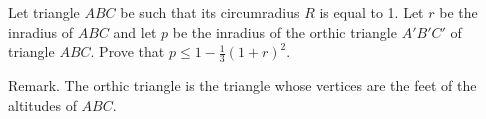 Let triangle $ABC$ be such that its circumradius $R$ is equal to 1. Let $r$ be the inradius of $ABC$ and let $p$ be the inradius of the orthic triangle $A'B'C'$ of triangle $ABC$. Prove that $p \leq 1 - \frac{1}{3}(1+r)^2$.

Remark. The orthic triangle is the triangle whose vertices are the feet of the altitudes of $ABC$.
